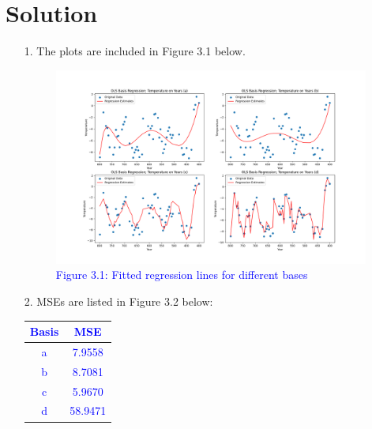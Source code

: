 \documentclass[submit]{../harvardml}
\newenvironment{solution}
  {\color{blue}\section*{Solution}}
{}
\begin{document}
\newpage 
\begin{solution}

\begin{enumerate}
    \item [1.] The plots are included in Figure 3.1 below.
    \vspace{-1em}
    \begin{figure}[H]
    \centering
    \includegraphics[width=0.98\textwidth]{img_output/p3.1.png}
    \caption*{\textcolor{blue}{Figure 3.1: Fitted regression lines for different bases}}
    \label{fig:q3.1}
    \end{figure}
    \item[2.] MSEs are listed in Figure 3.2 below:
    \begin{table}[H]
        \centering
        \renewcommand{\arraystretch}{1.2} %
    
        \begin{tabular}{|c|c|}
            \hline
            \textbf{\textcolor{blue}{Basis}} & \textbf{\textcolor{blue}{MSE}} \\ 
            \hline
            \textcolor{blue}{a} & \textcolor{blue}{7.9558} \\ 
            \textcolor{blue}{b} & \textcolor{blue}{8.7081} \\ 
            \textcolor{blue}{c} & \textcolor{blue}{5.9670} \\ 
            \textcolor{blue}{d} & \textcolor{blue}{58.9471} \\ 
            \hline
        \end{tabular}
        

\end{table}
\end{enumerate}
\end{solution}
\end{document}
